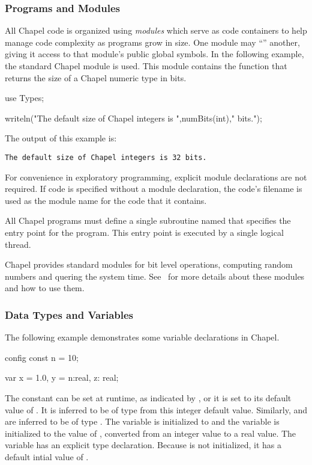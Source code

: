 \subsubsection{Programs and Modules}
\label{Programs_and_Modules}

All Chapel code is organized using \emph{modules} which serve as code
containers to help manage code complexity as programs grow in size.
One module may ``'' another, giving it access to that
module's public global symbols.  In the following example, the
standard Chapel module  is used.  This module contains
the  function that returns the size of a Chapel numeric
type in bits. 
\begin{chapel}
use Types;

writeln("The default size of Chapel integers is ",numBits(int)," bits.");
\end{chapel}
The output of this example is:
\begin{verbatim}
The default size of Chapel integers is 32 bits.
\end{verbatim}

For convenience in exploratory programming,
explicit module declarations are not required.  If code is specified 
without a module declaration, the code's
filename is used as the module name for the code that it contains.

All Chapel programs must define a single subroutine named
 that specifies the entry point for the program.  
This entry point is executed by a single logical thread.

Chapel provides standard modules for bit level operations, computing
random numbers and quering the system time.  See~
for more details about these modules and how to use them.

\subsubsection{Data Types and Variables}
\label{Data_Types_and_Variables}

The following example demonstrates some variable declarations in Chapel.
\begin{chapel}
config const n = 10;

var x = 1.0,
    y = n:real,
    z: real;
\end{chapel}

The constant  can be set at runtime, as indicated by , 
or it is set to its default value of .  It is inferred to be of 
type  from this integer default value.  Similarly,  and 
 are inferred to be of type .  The variable 
is initialized to  and the variable  is initialized to
the value of , converted from an integer value to a real value.
The variable  has an explicit type declaration.  
Because  is not initialized, it has a default intial value of .

